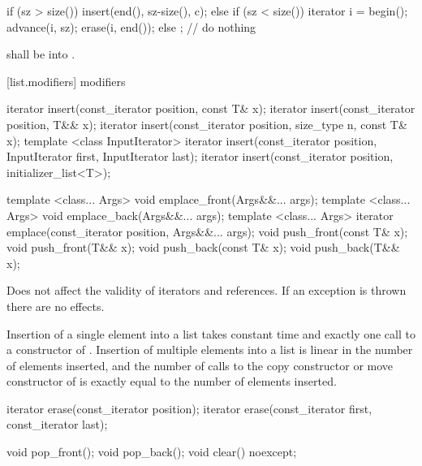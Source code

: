 \begin{itemdescr}
\pnum
\effects
\begin{codeblock}
if (sz > size())
  insert(end(), sz-size(), c);
else if (sz < size()) {
  iterator i = begin();
  advance(i, sz);
  erase(i, end());
}
else
  ;                 // do nothing
\end{codeblock}

\pnum
\requires {} shall be  into .
\end{itemdescr}

[list.modifiers]{ modifiers}

%
\begin{itemdecl}
iterator insert(const_iterator position, const T& x);
iterator insert(const_iterator position, T&& x);
iterator insert(const_iterator position, size_type n, const T& x);
template <class InputIterator>
  iterator insert(const_iterator position, InputIterator first,
                  InputIterator last);
iterator insert(const_iterator position, initializer_list<T>);

template <class... Args> void emplace_front(Args&&... args);
template <class... Args> void emplace_back(Args&&... args);
template <class... Args> iterator emplace(const_iterator position, Args&&... args);
void push_front(const T& x);
void push_front(T&& x);
void push_back(const T& x);
void push_back(T&& x);
\end{itemdecl}

\begin{itemdescr}
\pnum
\notes
Does not affect the validity of iterators and references.
If an exception is thrown there are no effects.

\pnum
\complexity
Insertion of a single element into a list takes constant time and
exactly one call to a constructor of
. Insertion of multiple elements into a list is linear in the
number of elements inserted, and the number of calls to the copy
constructor or move constructor of  is exactly equal
to the number of elements inserted.
\end{itemdescr}

%
\begin{itemdecl}
iterator erase(const_iterator position);
iterator erase(const_iterator first, const_iterator last);

void pop_front();
void pop_back();
void clear() noexcept;
\end{itemdecl}

